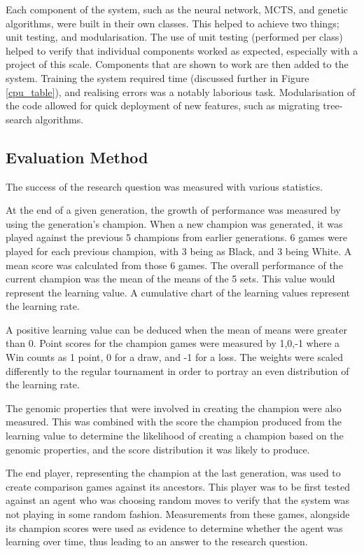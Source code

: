 \documentclass[12pt,a4paper]{article}
\begin{document}
        Each component of the system, such as the neural network, MCTS, and genetic algorithms, were built in their own classes. This helped to achieve two things; unit testing, and modularisation. The use of unit testing (performed per class) helped to verify that individual components worked as expected, especially with a project of this scale. Components that are shown to work are then added to the system. Training the system required time (discussed further in Figure \ref{cpu_table}), and realising errors was a notably laborious task. Modularisation of the code allowed for quick deployment of new features, such as migrating tree-search algorithms.
    
    \subsection{Evaluation Method}
        The success of the research question was measured with various statistics. 

        At the end of a given generation, the growth of performance was measured by using the generation's champion. When a new champion was generated, it was played against the previous 5 champions from earlier generations. 6 games were played for each previous champion, with 3 being as Black, and 3 being White. A mean score was calculated from those 6 games. The overall performance of the current champion was the mean of the means of the 5 sets. This value would represent the learning value. A cumulative chart of the learning values represent the learning rate.
        
        A positive learning value can be deduced when the mean of means were greater than 0. Point scores for the champion games were measured by {1,0,-1} where a Win counts as 1 point, 0 for a draw, and -1 for a loss. The weights were scaled differently to the regular tournament in order to portray an even distribution of the learning rate.

        The genomic properties that were involved in creating the champion were also measured. This was combined with the score the champion produced from the learning value to determine the likelihood of creating a champion based on the genomic properties, and the score distribution it was likely to produce.
    
        The end player, representing the champion at the last generation, was used to create comparison games against its ancestors. This player was to be first tested against an agent who was choosing random moves to verify that the system was not playing in some random fashion. Measurements from these games, alongside its champion scores were used as evidence to determine whether the agent was learning over time, thus leading to an answer to the research question.
\end{document}
